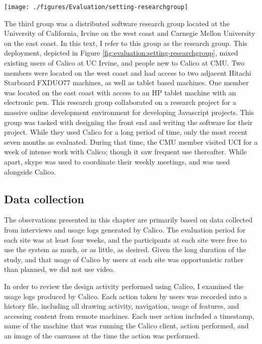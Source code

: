 \begin{figure*}[tbh]
  \centering
  \texttt{[image: ./figures/Evaluation/setting-researchgroup]}
  \caption{The physical setup of the research group}
  \label{fig:evaluation:setting-researchgroup}
\end{figure*}

The third group was a distributed software research group located at the University of California, Irvine on the west coast and Carnegie Mellon University on the east coast. In this text, I refer to this group as the research group. This deployment, depicted in Figure \ref{fig:evaluation:setting-researchgroup}, mixed existing users of Calico at UC Irvine, and people new to Calico at CMU. Two members were located on the west coast and had access to two adjacent Hitachi Starboard FXDUO77 machines, as well as tablet based machines. One member was located on the east coast with access to an HP tablet machine with an electronic pen. This research group collaborated on a research project for a massive online development environment for developing Javascript projects. This group was tasked with designing the front end and writing the software for their project. While they used Calico for a long period of time, only the most recent seven months as evaluated. During that time, the CMU member visited UCI for a week of intense work with Calico; though it saw frequent use thereafter. While apart, skype was used to coordinate their weekly meetings, and was used alongside Calico.

\subsection{Data collection}

The observations presented in this chapter are primarily based on data collected from interviews and usage logs generated by Calico. The evaluation period for each site was at least four weeks, and the participants at each site were free to use the system as much, or as little, as desired. Given the long duration of the study, and that usage of Calico by users at each site was opportunistic rather than planned, we did not use video.

In order to review the design activity performed using Calico, I examined the usage logs produced by Calico. Each action taken by users was recorded into a history file, including all drawing activity, navigation, usage of features, and accessing content from remote machines. Each user action included a timestamp, name of the machine that was running the Calico client, action performed, and an image of the canvases at the time the action was performed. 

